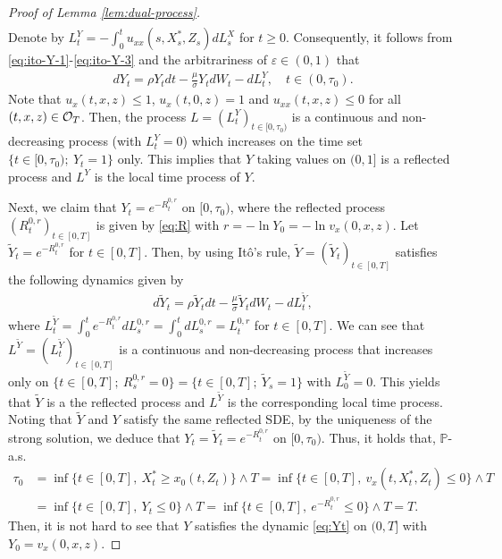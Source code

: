 \documentclass[11pt,times,letter]{article}
\newcommand{\Px}{ \mathbb{P} }
\numberwithin{equation}{section}
\begin{document}
\begin{proof}[Proof of Lemma \ref{lem:dual-process}]
\begin{align}
\end{align}
Denote by $L_t^Y=-\int_0^{t}  u_{xx}(s,X_{s}^*,Z_s)dL_s^X$ for $t\geq 0$. Consequently, it follows from \eqref{eq:ito-Y-1}-\eqref{eq:ito-Y-3} and the arbitrariness of $\varepsilon\in(0,1)$ that
\begin{align*}
dY_t= \rho Y_tdt-\frac{\mu}{\sigma}Y_tdW_t-dL_t^Y,\quad t\in(0,\tau_0).
\end{align*}
Note that $u_x(t,x,z)\leq 1$, $u_x(t,0,z)= 1$ and $u_{xx}(t,x,z)\leq 0$ for all $(t,x,z)\in{\cal O}_T$. Then,  the process $L=(L_t^Y)_{t\in[0,\tau_0)}$ is a continuous and non-decreasing process (with $L_t^{Y}=0$)  which increases on the time set $\{t\in[0,\tau_0);~Y_t=1\}$ only. This implies that  $Y$ taking values on $(0,1]$ is a reflected process and $L^Y$ is the local time process of $Y$. 

Next, we claim that $Y_t=e^{-R_t^{0,r}}$ on $[0,\tau_0)$, where  the reflected process $(R_t^{0,r})_{t\in [0,T]}$ is given by \eqref{eq:R} with $r=-\ln Y_0=-\ln v_x(0,x,z)$. Let $\tilde{Y}_t=e^{-R_t^{0,r}}$ for $t\in[0,T]$. Then, by using It\^o's rule, $\tilde{Y}=(\tilde{Y}_t)_{t\in[0,T]}$ satisfies the following dynamics given by
\begin{align*}
d\tilde{Y}_t= \rho \tilde{Y}_tdt-\frac{\mu}{\sigma}\tilde{Y}_tdW_t-dL_t^{\tilde{Y}},
\end{align*}
where $L_t^{\tilde{Y}}=\int_0^t e^{-R_t^{0,r}} dL_s^{0,r}=\int_0^t  dL_s^{0,r}=L_t^{0,r}$ for $t\in[0,T]$. We can see that $L^{\tilde{Y}}=(L_t^{\tilde{Y}})_{t\in [0,T]}$ is a continuous and non-decreasing process that increases only on $\{t \in[0, T] ;~R_s^{0,r}=0\}=\{t \in[0, T] ;~\tilde{Y}_s=1\}$ with $L_0^{\tilde{Y}}=0$. This yields that $\tilde{Y}$ is a  the reflected process and $L^{\tilde{Y}}$ is the corresponding local time process. Noting that $\tilde{Y}$ and $Y$ satisfy the same reflected SDE, by the uniqueness of the strong solution, we deduce that $Y_t=\tilde{Y}_t=e^{-R_t^{0,r}}$ on $[0,\tau_0)$. Thus, it holds that, $\Px$-a.s.
\begin{align*}
\tau_0&=\inf\{t\in[0,T] ,~ X_t^*\geq x_0(t,Z_t)\}\wedge T=\inf\{t\in[0,T] ,~ v_x(t,X_t^*,Z_t)\leq0\}\wedge T\nonumber\\
&=\inf\{t\in[0,T] ,~ Y_t\leq 0\}\wedge T=\inf\{t\in[0,T] ,~ e^{-R_t^{0,r}}\leq 0\}\wedge T=T.
\end{align*}
Then, it is not hard to see that $Y$ satisfies the dynamic \eqref{eq:Yt} on $(0,T]$ with $Y_0=v_x(0,x,z)$.


\end{proof}
\end{document}
